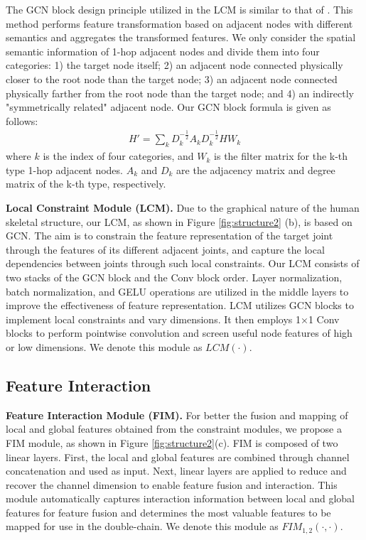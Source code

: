 \documentclass[journal]{IEEEtran}
\begin{document}
The GCN block design principle utilized in the LCM is similar to that of \cite{cai2019exploiting}. This method performs feature transformation based on adjacent nodes with different semantics and aggregates the transformed features. We only consider the spatial semantic information of 1-hop adjacent nodes and divide them into four categories: 1) the target node itself; 2) an adjacent node connected physically closer to the root node than the target node; 3) an adjacent node connected physically farther from the root node than the target node; and 4) an indirectly "symmetrically related" adjacent node. Our GCN block formula is given as follows:
\begin{gather}
\label{eq:gcn1}
H' = \sum_{k}D_k^{-\frac{1}{2}}A_kD_k^{-\frac{1}{2}}HW_k
\end{gather}
where $k$ is the index of four categories, and $W_k$ is the filter matrix for the k-th type 1-hop adjacent nodes. $A_k$ and $D_k$ are the adjacency matrix and degree matrix of the k-th type, respectively.







{\bf{Local Constraint Module (LCM).}} Due to the graphical nature of the human skeletal structure, our LCM, as shown in Figure \ref{fig:structure2} (b), is based on GCN. The aim is to constrain the feature representation of the target joint through the features of its different adjacent joints, and capture the local dependencies between joints through such local constraints. Our LCM consists of two stacks of the GCN block and the Conv block order. Layer normalization, batch normalization, and GELU operations are utilized in the middle layers to improve the effectiveness of feature representation. LCM utilizes GCN blocks to implement local constraints and vary dimensions. It then employs 1×1 Conv blocks to perform pointwise convolution and screen useful node features of high or low dimensions. We denote this module as $LCM(\cdot )$.


\subsection{Feature Interaction}


{\bf{Feature Interaction Module (FIM).}} For better the fusion and mapping of local and global features obtained from the constraint modules, we propose a FIM module, as shown in Figure \ref{fig:structure2}(c). FIM is composed of two linear layers. First, the local and global features are combined through channel concatenation and used as input. Next, linear layers are applied to reduce and recover the channel dimension to enable feature fusion and interaction. This module automatically captures interaction information between local and global features for feature fusion and determines the most valuable features to be mapped for use in the double-chain. We denote this module as $FIM_{1,2}(\cdot,\cdot)$.
\end{document}
